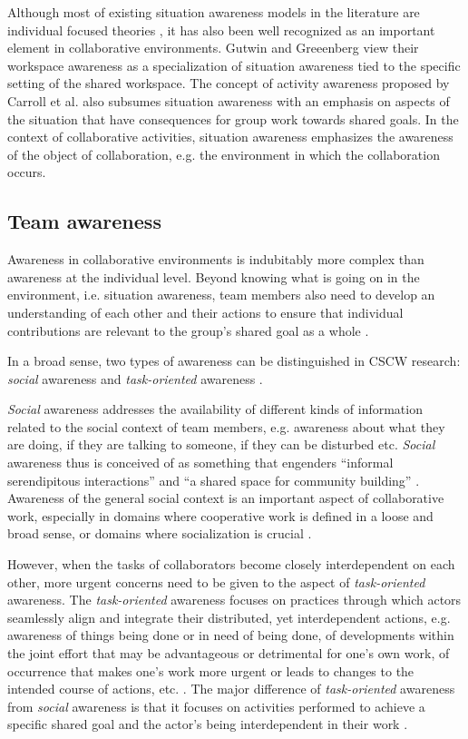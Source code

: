 Although most of existing situation awareness models in the literature are individual focused theories \cite{Salmon2008}, it has also been well recognized as an important element in collaborative environments. Gutwin and Greeenberg \cite{Gutwin2002} view their workspace awareness as a specialization of situation awareness tied to the specific setting of the shared workspace. The concept of activity awareness proposed by Carroll et al. \cite{carroll2003a} also subsumes situation awareness with an emphasis on aspects of the situation that have consequences for group work towards shared goals. In the context of collaborative activities, situation awareness emphasizes the awareness of the object of collaboration, e.g. the environment in which the collaboration occurs.
\subsection{Team awareness} %
\label{sub:team_awareness}
Awareness in collaborative environments is indubitably more complex than awareness at the individual level. Beyond knowing what is going on in the environment, i.e. situation awareness, team members also need to develop an understanding of each other and their actions to ensure that individual contributions are relevant to the group's shared goal as a whole \cite{dourish1992awareness}. 

In a broad sense, two types of awareness can be distinguished in CSCW research: \emph{social} awareness and \emph{task-oriented} awareness \cite{prinz1999a,schmidt2002a,carroll2003a}.

\emph{Social} awareness addresses the availability of different kinds of information related to the social context of team members, e.g. awareness about what they are doing, if they are talking to someone, if they can be disturbed etc. \emph{Social} awareness thus is conceived of as something that engenders ``informal serendipitous interactions'' \cite{hudson1996a} and ``a shared space for community building'' \cite{Dourish1992}. Awareness of the general social context is an important aspect of collaborative work, especially in domains where cooperative work is defined in a loose and broad sense, or domains where socialization is crucial \cite{schmidt2002a}.

However, when the tasks of collaborators become closely interdependent on each other, more urgent concerns need to be given to the aspect of \emph{task-oriented} awareness. The \emph{task-oriented} awareness focuses on practices through which actors seamlessly align and integrate their distributed, yet interdependent actions, e.g. awareness of things being done or in need of being done, of developments within the joint effort that may be advantageous or detrimental for one's own work, of occurrence that makes one's work more urgent or leads to changes to the intended course of actions, etc. \cite{schmidt2002a}. The major difference of \emph{task-oriented} awareness from \emph{social} awareness is that it focuses on activities performed to achieve a specific shared goal \cite{carroll2003a} and the actor's being interdependent in their work \cite{schmidt2002a}.

